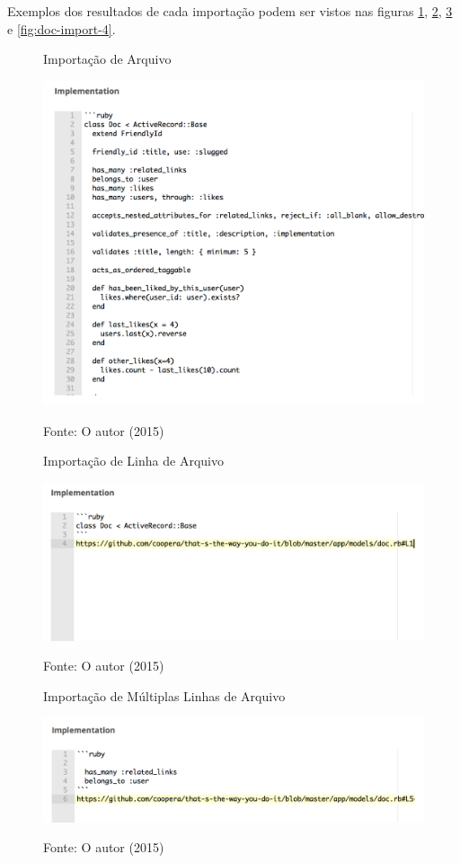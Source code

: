 Exemplos dos resultados de cada importação podem ser vistos nas figuras \ref{fig:doc-import-1}, \ref{fig:doc-import-2}, \ref{fig:doc-import-3} e \ref{fig:doc-import-4}.
\begin{figure}[h]
	\centering
    \caption{Importação de Arquivo}
    \includegraphics[width=15cm]{Imagens/import-file.png}
		\label{fig:doc-import-1}
	\caption*{Fonte: O autor (2015)}
\end{figure}

\begin{figure}[h]
	\centering
    \caption{Importação de Linha de Arquivo}
    \includegraphics[width=15cm]{Imagens/import-line.png}
		\label{fig:doc-import-2}
	\caption*{Fonte: O autor (2015)}
\end{figure}

\begin{figure}[h]
	\centering
    \caption{Importação de Múltiplas Linhas de Arquivo}
    \includegraphics[width=15cm]{Imagens/import-lines.png}
		\label{fig:doc-import-3}
	\caption*{Fonte: O autor (2015)}
\end{figure}

